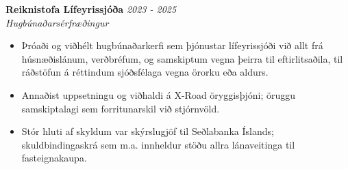 \documentclass[a4paper,10pt]{article}
\newcommand{\workentry}[4]{%
  \noindent
  {\large\textbf{#1}} \hfill \textit{#2}\\[0.1cm]     
  {\textit{#3}}\\[0.1cm]  %
  #4
  \vspace{0.3cm}  %
}
\begin{document}
\workentry{Reiknistofa Lífeyrissjóða}{2023 - 2025}{Hugbúnaðarsérfræðingur}{
	\vspace{-0.4cm}  %

	\begin{itemize}[itemsep=-0.4cm]
		\item Þróaði og viðhélt hugbúnaðarkerfi sem þjónustar lífeyrissjóði við allt frá húsnæðislánum, verðbréfum, og samskiptum vegna þeirra til eftirlitsaðila, til ráðstöfun á réttindum sjóðsfélaga vegna örorku eða aldurs.\\
		\item Annaðist uppsetningu og viðhaldi á X-Road öryggisþjóni; öruggu samskiptalagi sem forritunarskil við stjórnvöld. \\
		\item Stór hluti af skyldum var skýrslugjöf til Seðlabanka Íslands; skuldbindingaskrá sem m.a. innheldur stöðu allra lánaveitinga til fasteignakaupa.\\
	\end{itemize}

}
 
\end{document}
